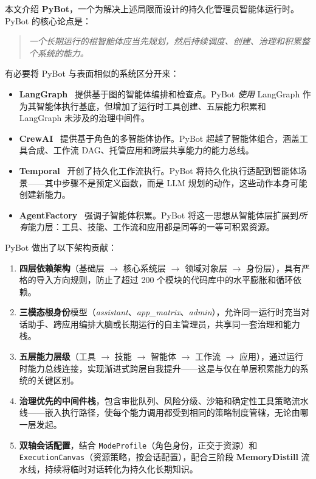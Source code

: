 \documentclass[11pt,a4paper]{article}
\begin{document}
本文介绍 \textbf{PyBot}，一个为解决上述局限而设计的持久化管理员智能体运行时。
PyBot 的核心论点是：

\begin{quote}
\emph{一个长期运行的根智能体应当先规划，然后持续调度、创建、治理和积累整个系统的能力。}
\end{quote}

\noindent 有必要将 PyBot 与表面相似的系统区分开来：
\begin{itemize}
  \item \textbf{LangGraph}~\cite{langgraph2024} 提供基于图的智能体编排和检查点。PyBot \emph{使用} LangGraph 作为其智能体执行基底，但增加了运行时工具创建、五层能力积累和 LangGraph 未涉及的治理中间件。
  \item \textbf{CrewAI}~\cite{crewai2024} 提供基于角色的多智能体协作。PyBot 超越了智能体组合，涵盖工具合成、工作流 DAG、托管应用和跨层共享能力的能力总线。
  \item \textbf{Temporal}~\cite{temporal2023} 开创了持久化工作流执行。PyBot 将持久化执行适配到智能体场景——其中步骤不是预定义函数，而是 LLM 规划的动作，这些动作本身可能创建新能力。
  \item \textbf{AgentFactory}~\cite{agentfactory2024} 强调子智能体积累。PyBot 将这一思想从智能体层扩展到\emph{所有}能力层：工具、技能、工作流和应用都是同等的一等可积累资源。
\end{itemize}

\noindent PyBot 做出了以下架构贡献：

\begin{enumerate}[label=\textbf{C\arabic*.}]
  \item \textbf{四层依赖架构}（基础层 $\to$ 核心系统层 $\to$ 领域对象层 $\to$ 身份层），具有严格的导入方向规则，防止了超过 200 个模块的代码库中的水平膨胀和循环依赖。
  \item \textbf{三模态根身份}模型（\textit{assistant}、\textit{app\_matrix}、\textit{admin}），允许同一运行时充当对话助手、跨应用编排大脑或长期运行的自主管理员，共享同一套治理和能力栈。
  \item \textbf{五层能力层级}（工具 $\to$ 技能 $\to$ 智能体 $\to$ 工作流 $\to$ 应用），通过运行时能力总线连接，实现渐进式跨层自我提升——这是与仅在单层积累能力的系统的关键区别。
  \item \textbf{治理优先的中间件栈}，包含审批队列、风险分级、沙箱和确定性工具策略流水线——嵌入执行路径，使每个能力调用都受到相同的策略制度管辖，无论由哪一层发起。
  \item \textbf{双轴会话配置}，结合 \texttt{ModeProfile}（角色身份，正交于资源）和 \texttt{ExecutionCanvas}（资源策略，按会话配置），配合三阶段 \textbf{MemoryDistill} 流水线，持续将临时对话转化为持久化长期知识。
\end{enumerate}
\end{document}
